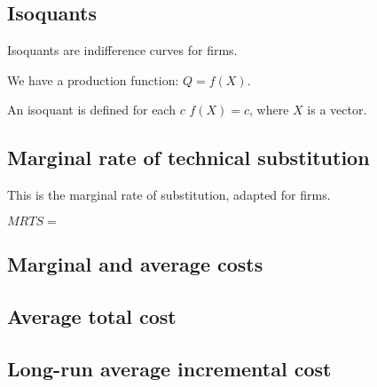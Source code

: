 
\subsection{Isoquants}

Isoquants are indifference curves for firms.

We have a production function: \(Q=f(X)\).

An isoquant is defined for each \(c\) \(f(X)=c\), where \(X\) is a vector.

\subsection{Marginal rate of technical substitution}

This is the marginal rate of substitution, adapted for firms.

\(MRTS=\)

\subsection{Marginal and average costs}

\subsection{Average total cost}

\subsection{Long-run average incremental cost}

